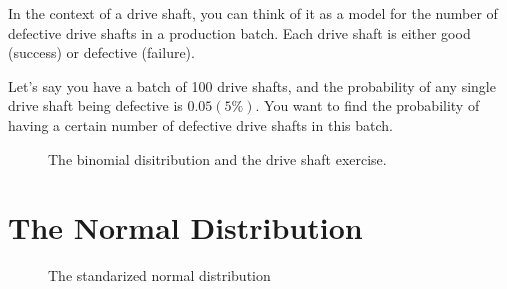 \documentclass[
  a4paper,
]{scrbook}
\begin{document}
In the context of a drive shaft, you can think of it as a model for the
number of defective drive shafts in a production batch. Each drive shaft
is either good (success) or defective (failure).

Let's say you have a batch of 100 drive shafts, and the probability of
any single drive shaft being defective is \(0.05 (5\%)\). You want to
find the probability of having a certain number of defective drive
shafts in this batch.

\begin{figure}[ht]


\caption{\label{fig-bn-ds}The binomial disitribution and the drive shaft
exercise.}

\end{figure}%

\section{The Normal Distribution}\label{the-normal-distribution}

\begin{figure}[ht]


\caption{\label{fig-normal-dist}The standarized normal distribution}

\end{figure}%
\end{document}
